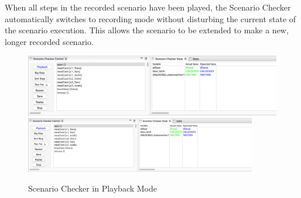 When all steps in the recorded scenario have been played, the Scenario Checker automatically switches to recording mode without disturbing the current state of the scenario execution. This allows the scenario to be extended to make a new, longer recorded scenario.

\begin{figure}[!htbp]
	\centering
	\ifplastex
	\includegraphics[width=900]{figures/playback}
	\else
	\includegraphics[width=0.9\textwidth]{figures/playback}
	\fi
	\caption{Scenario Checker in Playback Mode}
	\label{fig:playback}
\end{figure}
